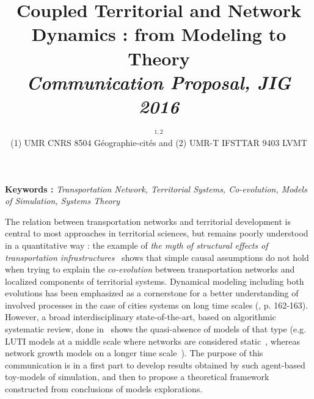 


\title{\vspace{-1.8cm}Coupled Territorial and Network Dynamics : from Modeling to Theory\\
\textit{Communication Proposal, JIG 2016}
}
\author{\small{}$^{1,2}$\\
\small(1) UMR CNRS 8504 Géographie-cités and (2) UMR-T IFSTTAR 9403 LVMT
}
\date{}

\maketitle

\justify


\vspace{-0.5cm}
\textbf{Keywords : }\textit{Transportation Network, Territorial Systems, Co-evolution, Models of Simulation, Systems Theory}

\medskip

The relation between transportation networks and territorial development is central to most approaches in territorial sciences, but remains poorly understood in a quantitative way : the example of \emph{the myth of structural effects of transportation infrastructures}~\citep{offner1993effets} shows that simple causal assumptions do not hold when trying to explain the \emph{co-evolution} between transportation networks and localized components of territorial systems. Dynamical modeling including both evolutions has been emphasized as a cornerstone for a better understanding of involved processes in the case of cities systems on long time scales (\citep{bretagnolle:tel-00459720}, p. 162-163). However, a broad interdisciplinary state-of-the-art, based on algorithmic systematic review, done in~\citep{raimbault2015models} shows the quasi-absence of models of that type (e.g. LUTI models at a middle scale where networks are considered static~\citep{iacono2008models}, whereas network growth models on a longer time scale~\citep{xie2009modeling}). The purpose of this communication is in a first part to develop results obtained by such agent-based toy-models of simulation, and then to propose a theoretical framework constructed from conclusions of models explorations.

